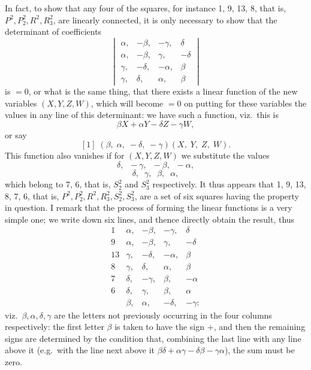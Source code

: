 \documentclass[11pt,a4paper]{article}
\begin{document}
\noindent In fact, to show that any four of the squares, for instance 1, 9, 13, 8, that is, $P^{2}, P_{2}^{2}, R^{2}, R_{3}^{2}$, are linearly connected, it is only necessary to show that the determinant of coefficients
\[
\begin{vmatrix}
\alpha, & -\beta, & -\gamma, & \delta\\
\alpha, & -\beta, & \gamma, & -\delta\\
\gamma, & -\delta, & -\alpha, & \beta\\
\gamma, & \delta, & \alpha, & \beta
\end{vmatrix}
\]
is $= 0$, or what is the same thing, that there exists a linear function of the new variables $(X, Y, Z, W)$, which will become $= 0$ on putting for these variables the values in any line of this determinant: we have such a function, viz.\ this is
\[
\beta X + \alpha Y - \delta Z - \gamma W,
\]
or say
\[
[1]\;(\beta,\;\alpha,\;-\delta,\;-\gamma)(X,\;Y,\;Z,\;W).
\]
This function also vanishes if for $(X, Y, Z, W)$ we substitute the values
\[
\delta,\;\; -\gamma,\;\; -\beta,\;\; -\alpha,
\]
\[
\delta,\;\; \gamma,\;\; \beta,\;\; \alpha,
\]
which belong to 7, 6, that is, $S_{2}^{2}$ and $S_{3}^{2}$ respectively. It thus appears that 1, 9, 13, 8, 7, 6, that is, $P^{2}, P_{2}^{2}, R^{2}, R_{3}^{2}, S_{2}^{2}, S_{3}^{2}$, are a set of six squares having the property in question. I remark that the process of forming the linear functions is a very simple one; we write down six lines, and thence directly obtain the result, thus
\[
\begin{array}{rrrrr}
1 & \alpha, & -\beta, & -\gamma, & \delta\\
9 & \alpha, & -\beta, & \gamma, & -\delta\\
13 & \gamma, & -\delta, & -\alpha, & \beta\\
8 & \gamma, & \delta, & \alpha, & \beta\\
7 & \delta, & -\gamma, & \beta, & -\alpha\\
6 & \delta, & \gamma, & \beta, & \alpha\\
 & \beta, & \alpha, & -\delta, & -\gamma:
\end{array}
\]
viz.\ $\beta, \alpha, \delta, \gamma$ are the letters not previously occurring in the four columns respectively: the first letter $\beta$ is taken to have the sign $+$, and then the remaining signs are determined by the condition that, combining the last line with any line above it (e.g.\ with the line next above it $\beta\delta + \alpha\gamma - \delta\beta - \gamma\alpha$), the sum must be zero.
\end{document}
